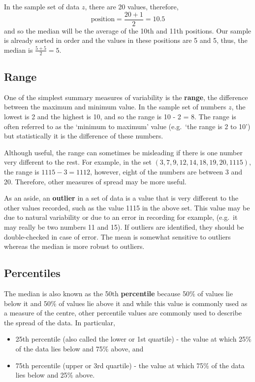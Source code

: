 \documentclass[
  oneside]{krantz}
\begin{document}
In the sample set of data \(z\), there are 20 values, therefore, \[\textrm{position}=\frac{20+1}{2}=10.5\]
and so the median will be the average of the 10th and 11th positions. Our sample is already sorted in order and the values in these positions are 5 and 5, thus, the median is \(\frac{5+5}2 = 5\).

\hypertarget{range}{%
\subsection{Range}\label{range}}

One of the simplest summary measures of variability is the \textbf{range}, the difference between the maximum and minimum value. In the sample set of numbers \(z\), the lowest is 2 and the highest is 10, and so the range is 10 - 2 = 8. The range is often referred to as the `minimum to maximum' value (e.g.~`the range is 2 to 10') but statistically it is the difference of these numbers.

Although useful, the range can sometimes be misleading if there is one number very different to the rest. For example, in the set \((3, 7, 9, 12, 14, 18, 19, 20, 1115)\), the range is \(1115 - 3 = 1112\), however, eight of the numbers are between 3 and 20. Therefore, other measures of spread may be more useful.

As an aside, an \textbf{outlier} in a set of data is a value that is very different to the other values recorded, such as the value 1115 in the above set. This value may be due to natural variability or due to an error in recording for example, (e.g.~it may really be two numbers 11 and 15). If outliers are identified, they should be double-checked in case of error. The mean is somewhat sensitive to outliers whereas the median is more robust to outliers.

\hypertarget{percentiles}{%
\subsection{Percentiles}\label{percentiles}}

The median is also known as the 50th \textbf{percentile} because 50\% of values lie below it and 50\% of values lie above it and while this value is commonly used as a measure of the centre, other percentile values are commonly used to describe the spread of the data. In particular,

\begin{itemize}
\item
  25th percentile (also called the lower or 1st quartile) - the value at which 25\% of the data lies below and 75\% above, and
\item
  75th percentile (upper or 3rd quartile) - the value at which 75\% of the data lies below and 25\% above.
\end{itemize}
\end{document}
